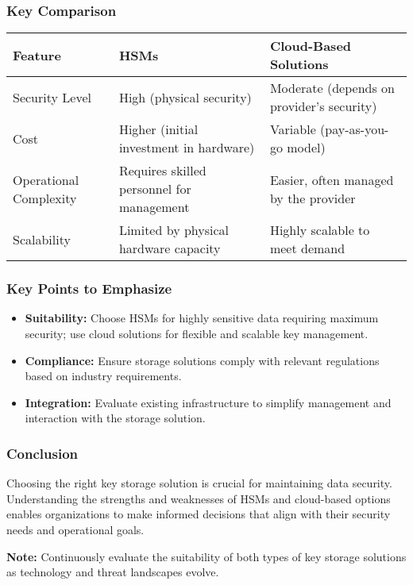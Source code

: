 \documentclass{beamer}
\begin{document}
\begin{frame}[fragile]
    \frametitle{Key Comparison}
    \begin{tabular}{|l|l|l|}
        \hline
        \textbf{Feature} & \textbf{HSMs} & \textbf{Cloud-Based Solutions} \\
        \hline
        Security Level & High (physical security) & Moderate (depends on provider's security) \\
        \hline
        Cost & Higher (initial investment in hardware) & Variable (pay-as-you-go model) \\
        \hline
        Operational Complexity & Requires skilled personnel for management & Easier, often managed by the provider \\
        \hline
        Scalability & Limited by physical hardware capacity & Highly scalable to meet demand \\
        \hline
    \end{tabular}
\end{frame}

\begin{frame}[fragile]
    \frametitle{Key Points to Emphasize}
    \begin{itemize}
        \item \textbf{Suitability:} Choose HSMs for highly sensitive data requiring maximum security; use cloud solutions for flexible and scalable key management.
        \item \textbf{Compliance:} Ensure storage solutions comply with relevant regulations based on industry requirements.
        \item \textbf{Integration:} Evaluate existing infrastructure to simplify management and interaction with the storage solution.
    \end{itemize}
\end{frame}

\begin{frame}[fragile]
    \frametitle{Conclusion}
    Choosing the right key storage solution is crucial for maintaining data security. Understanding the strengths and weaknesses of HSMs and cloud-based options enables organizations to make informed decisions that align with their security needs and operational goals.
    
    \textbf{Note:} Continuously evaluate the suitability of both types of key storage solutions as technology and threat landscapes evolve.
\end{frame}
\end{document}
